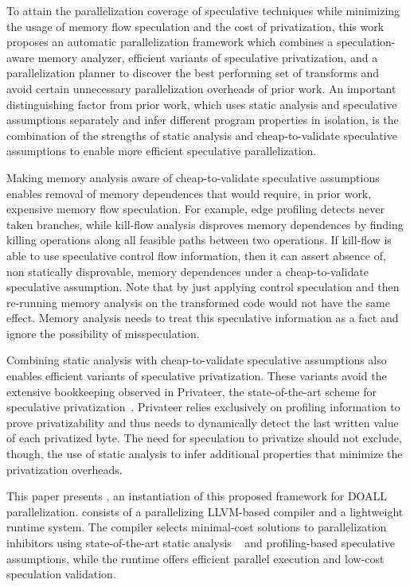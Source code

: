 To attain the parallelization coverage of speculative techniques
while minimizing the usage of memory flow speculation and the cost of
privatization,
%
this work proposes an automatic parallelization framework which
combines a speculation-aware memory analyzer, efficient variants of
speculative privatization, and a parallelization planner
to discover the best performing set of transforms and avoid certain
unnecessary parallelization overheads of prior work.
%
An important distinguishing factor from prior work, which uses static
analysis and speculative assumptions separately and infer different
program properties in isolation, is the combination of the strengths of
static analysis and cheap-to-validate speculative assumptions to
enable more efficient speculative parallelization.

Making memory analysis aware of cheap-to-validate speculative
assumptions enables removal of memory dependences that would require,
in prior work, expensive memory flow speculation.
%
For example, edge profiling detects never taken branches, while
kill-flow analysis disproves memory dependences by finding killing
operations along all feasible paths between two operations. If
kill-flow is able to use speculative control flow information, then it
can assert absence of, non statically disprovable, memory dependences
under a cheap-to-validate speculative assumption.
Note that by just applying control speculation and then re-running
memory analysis on the transformed code would not have the same
effect.  Memory analysis needs to treat this speculative information
as a fact and ignore the possibility of misspeculation.

Combining static analysis with cheap-to-validate speculative
assumptions also enables efficient variants of speculative
privatization.
%
These variants avoid the extensive bookkeeping observed in
Privateer, the state-of-the-art scheme for speculative
privatization~\cite{johnson:12:pldi}.
%
Privateer relies exclusively on profiling
information to prove privatizability and thus needs to dynamically
detect the last written value of each privatized byte.
%
The need for speculation to privatize should not exclude, though, the
use of static analysis to infer additional properties that minimize
the privatization overheads.

This paper presents \namensp, an instantiation of this proposed framework
for DOALL parallelization. \name consists of a parallelizing
LLVM-based compiler and a lightweight
runtime system. The compiler selects minimal-cost solutions to
parallelization inhibitors using state-of-the-art static analysis
~\cite{johnson:14:pldi} and profiling-based speculative
assumptions, while the runtime offers efficient parallel execution and
low-cost speculation validation.

